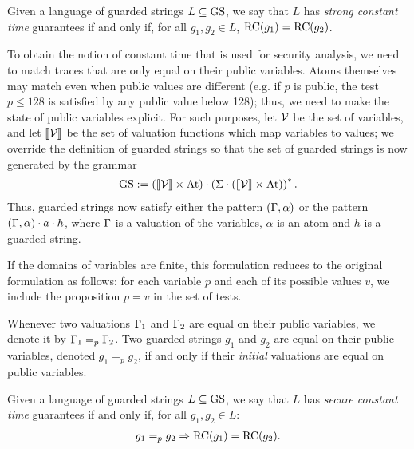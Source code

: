 \begin{definition}
Given a language of guarded strings $L\subseteq \text{GS}$, we say that $L$ has \emph{strong constant time} guarantees if and only if, for all $g_1, g_2 \in L$, $\text{RC}(g_1)=\text{RC}(g_2)$. 
\end{definition}
To obtain the notion of constant time that is used for security analysis, we need to match traces that are only equal on their public variables. Atoms themselves may match even when public values are different (e.g. if $p$ is public, the test $p\leq 128$ is satisfied by any public value below 128); thus, we need to make the state of public variables explicit. For such purposes, let $\mathcal{V}$ be the set of variables, and let $\llbracket \mathcal{V}\rrbracket$ be the set of valuation functions which map variables to values; we override the definition of guarded strings so that the set of guarded strings is now generated by the grammar
\begin{align}
\text{GS} := \left(\llbracket \mathcal{V}\rrbracket\times\text{At}\right) \cdot \left(\Sigma\cdot \left(\llbracket \mathcal{V}\rrbracket\times\text{At}\right)\right)^{*}.
\end{align}
Thus, guarded strings now satisfy either the pattern $(\Gamma,\alpha)$ or the pattern $(\Gamma,\alpha)\cdot a\cdot h$, where $\Gamma$ is a valuation of the variables, $\alpha$ is an atom and $h$ is a guarded string.

\begin{remark}
{If the domains of variables are finite, this formulation reduces to the original formulation as follows: for each variable $p$ and each of its possible values $v$, we include the proposition $p=v$ in the set of tests.}
\end{remark}
\begin{definition}
Whenever two valuations $\Gamma_1$ and $\Gamma_2$ are equal on their public variables, we denote it by $\Gamma_1=_p\Gamma_2$. Two guarded strings $g_1$ and $g_2$ are equal on their public variables, denoted $g_1=_p g_2$, if and only if their \emph{initial} valuations are equal on public variables. 
\end{definition}
\begin{definition}
Given a language of guarded strings $L\subseteq \text{GS}$, we say that $L$ has \emph{secure constant time} guarantees if and only if, for all $g_1, g_2 \in L:$
\begin{align}
g_1=_p g_2\Rightarrow\text{RC}(g_1)=\text{RC}(g_2).
\end{align}
\end{definition}

